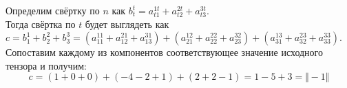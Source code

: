 \documentclass{article}
\begin{document}
\begin{center}
Определим свёртку по $n$ как $b^t_t = a^{1t}_{t1} + a^{2t}_{t2} + a^{3t}_{t3}$. \\
Тогда свёртка по $t$ будет выглядеть как $c = b^1_1 + b^2_2 + b^3_3 = \left (a^{11}_{11} + a^{21}_{12} + a^{31}_{13}\right ) + \left (a^{12}_{21} + a^{22}_{22} + a^{32}_{23}\right ) + \left (a^{13}_{31} + a^{23}_{32} + a^{33}_{33}\right )$. \\
Сопоставим каждому из компонентов соответствующее значение исходного тензора и получим:
$$c = (1 + 0 + 0) + (-4 - 2 + 1) + (2 + 2 - 1) = 1 - 5 + 3 = \Vert-1\Vert$$ 
\end{center}
\end{document}
